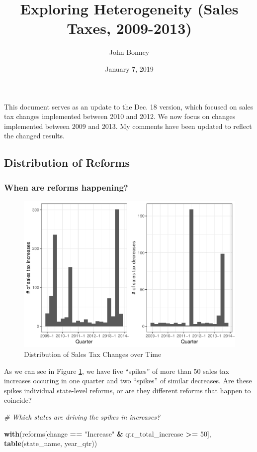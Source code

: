 \documentclass[]{article}
\title{Exploring Heterogeneity (Sales Taxes, 2009-2013)}
\author{John Bonney}
\date{January 7, 2019}
\newenvironment{Shaded}{\begin{snugshade}}{\end{snugshade}}
\newcommand{\KeywordTok}[1]{\textcolor[rgb]{0.13,0.29,0.53}{\textbf{#1}}}
\newcommand{\DecValTok}[1]{\textcolor[rgb]{0.00,0.00,0.81}{#1}}
\newcommand{\StringTok}[1]{\textcolor[rgb]{0.31,0.60,0.02}{#1}}
\newcommand{\CommentTok}[1]{\textcolor[rgb]{0.56,0.35,0.01}{\textit{#1}}}
\newcommand{\OperatorTok}[1]{\textcolor[rgb]{0.81,0.36,0.00}{\textbf{#1}}}
\newcommand{\NormalTok}[1]{#1}
\begin{document}
\maketitle

This document serves as an update to the Dec. 18 version, which focused
on sales tax changes implemented between 2010 and 2012. We now focus on
changes implemented between 2009 and 2013. My comments have been updated
to reflect the changed results.

\subsection{Distribution of Reforms}\label{distribution-of-reforms}

\subsubsection{When are reforms
happening?}\label{when-are-reforms-happening}

\begin{figure}
\centering
\includegraphics{exploring_heterogeneity_v2_files/figure-latex/plot_distribution-1.pdf}
\caption{\label{fig:plot_dist}Distribution of Sales Tax Changes over
Time}
\end{figure}

As we can see in Figure \ref{fig:plot_dist}, we have five ``spikes'' of
more than 50 sales tax increases occuring in one quarter and two
``spikes'' of similar decreases. Are these spikes individual state-level
reforms, or are they different reforms that happen to coincide?

\begin{Shaded}
\begin{Highlighting}[]
\CommentTok{# Which states are driving the spikes in increases?}

\KeywordTok{with}\NormalTok{(reforms[change }\OperatorTok{==}\StringTok{ "Increase"} \OperatorTok{&}\StringTok{ }\NormalTok{qtr_total_increase }\OperatorTok{>=}\StringTok{ }\DecValTok{50}\NormalTok{],}
     \KeywordTok{table}\NormalTok{(state_name, year_qtr))}
\end{Highlighting}
\end{Shaded}
\end{document}
